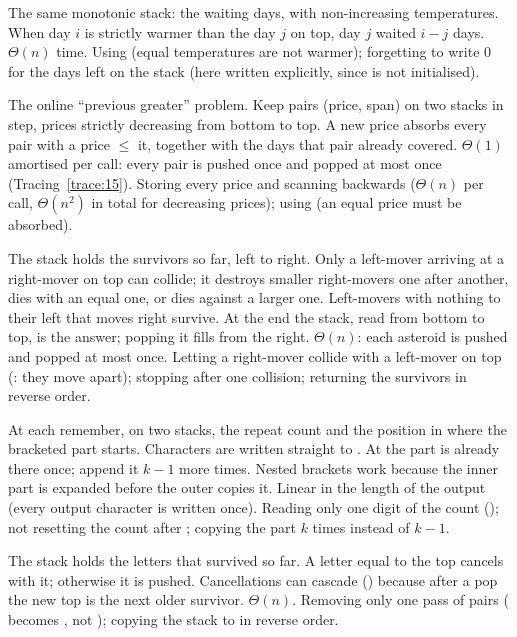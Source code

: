 \idea The same monotonic stack: the waiting days, with non-increasing temperatures.
When day $i$ is strictly warmer than the day $j$ on top, day $j$ waited $i-j$ days.
\complexity $\Theta(n)$ time.
\mistakes Using \cc{<=} (equal temperatures are not warmer); forgetting to write 0 for the
days left on the stack (here written explicitly, since  is not initialised).

\idea The online ``previous greater'' problem. Keep pairs (price, span) on two stacks in
step, prices strictly decreasing from bottom to top. A new price absorbs every pair with a
price $\le$ it, together with the days that pair already covered.
\complexity $\Theta(1)$ amortised per call: every pair is pushed once and popped at most
once (Tracing~\ref{trace:15}).
\mistakes Storing every price and scanning backwards ($\Theta(n)$ per call, $\Theta(n^2)$
in total for decreasing prices); using \cc{<} (an equal price must be absorbed).

\idea The stack holds the survivors so far, left to right. Only a left-mover arriving at a
right-mover on top can collide; it destroys smaller right-movers one after another, dies
with an equal one, or dies against a larger one. Left-movers with nothing to their left
that moves right survive. At the end the stack, read from bottom to top, is the answer;
popping it fills  from the right.
\complexity $\Theta(n)$: each asteroid is pushed and popped at most once.
\mistakes Letting a right-mover collide with a left-mover on top (\cc{[-2,-1,1,2]}: they
move apart); stopping after one collision; returning the survivors in reverse order.

\idea At each \cc{[} remember, on two stacks, the repeat count and the position in
 where the bracketed part starts. Characters are written straight to . At
\cc{]} the part  is already there once; append it $k-1$ more times.
Nested brackets work because the inner part is expanded before the outer \cc{]} copies it.
\complexity Linear in the length of the output (every output character is written once).
\mistakes Reading only one digit of the count (); not resetting the count after
\cc{[}; copying the part $k$ times instead of $k-1$.

\idea The stack holds the letters that survived so far. A letter equal to the top cancels
with it; otherwise it is pushed. Cancellations can cascade () because after a pop
the new top is the next older survivor.
\complexity $\Theta(n)$.
\mistakes Removing only one pass of pairs ( becomes , not );
copying the stack to  in reverse order.

